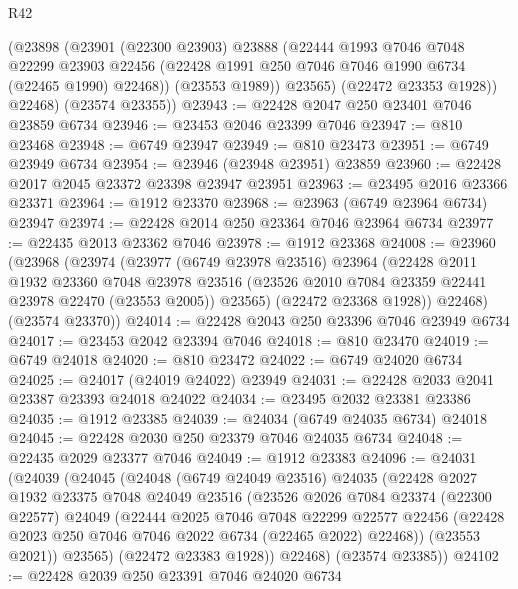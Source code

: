 \begin{lexlean}{R42}
\begin{coremodule}
{          (@23898
            (@23901
              (@22300 @23903)
              @23888
              (@22444
                @1993
                @7046
                @7048
                @22299
                @23903
                @22456
                (@22428 @1991 @250 @7046 @7046 @1990 @6734 (@22465 @1990) @22468))
              (@23553 @1989))
            @23565)
          (@22472 @23353 @1928))
        @22468)
      (@23574 @23355))
@23943 := @22428 @2047 @250 @23401 @7046 @23859 @6734
@23946 := @23453 @2046 @23399 @7046
@23947 := @810 @23468
@23948 := @6749 @23947
@23949 := @810 @23473
@23951 := @6749 @23949 @6734
@23954 := @23946 (@23948 @23951) @23859
@23960 := @22428 @2017 @2045 @23372 @23398 @23947 @23951
@23963 := @23495 @2016 @23366 @23371
@23964 := @1912 @23370
@23968 := @23963 (@6749 @23964 @6734) @23947
@23974 := @22428 @2014 @250 @23364 @7046 @23964 @6734
@23977 := @22435 @2013 @23362 @7046
@23978 := @1912 @23368
@24008 := @23960
    (@23968
      (@23974
        (@23977
          (@6749 @23978 @23516)
          @23964
          (@22428
            @2011
            @1932
            @23360
            @7048
            @23978
            @23516
            (@23526 @2010 @7084 @23359 @22441 @23978 @22470 (@23553 @2005))
            @23565)
          (@22472 @23368 @1928))
        @22468)
      (@23574 @23370))
@24014 := @22428 @2043 @250 @23396 @7046 @23949 @6734
@24017 := @23453 @2042 @23394 @7046
@24018 := @810 @23470
@24019 := @6749 @24018
@24020 := @810 @23472
@24022 := @6749 @24020 @6734
@24025 := @24017 (@24019 @24022) @23949
@24031 := @22428 @2033 @2041 @23387 @23393 @24018 @24022
@24034 := @23495 @2032 @23381 @23386
@24035 := @1912 @23385
@24039 := @24034 (@6749 @24035 @6734) @24018
@24045 := @22428 @2030 @250 @23379 @7046 @24035 @6734
@24048 := @22435 @2029 @23377 @7046
@24049 := @1912 @23383
@24096 := @24031
    (@24039
      (@24045
        (@24048
          (@6749 @24049 @23516)
          @24035
          (@22428
            @2027
            @1932
            @23375
            @7048
            @24049
            @23516
            (@23526
              @2026
              @7084
              @23374
              (@22300 @22577)
              @24049
              (@22444
                @2025
                @7046
                @7048
                @22299
                @22577
                @22456
                (@22428 @2023 @250 @7046 @7046 @2022 @6734 (@22465 @2022) @22468))
              (@23553 @2021))
            @23565)
          (@22472 @23383 @1928))
        @22468)
      (@23574 @23385))
@24102 := @22428 @2039 @250 @23391 @7046 @24020 @6734
}
\end{coremodule}
\end{lexlean}
